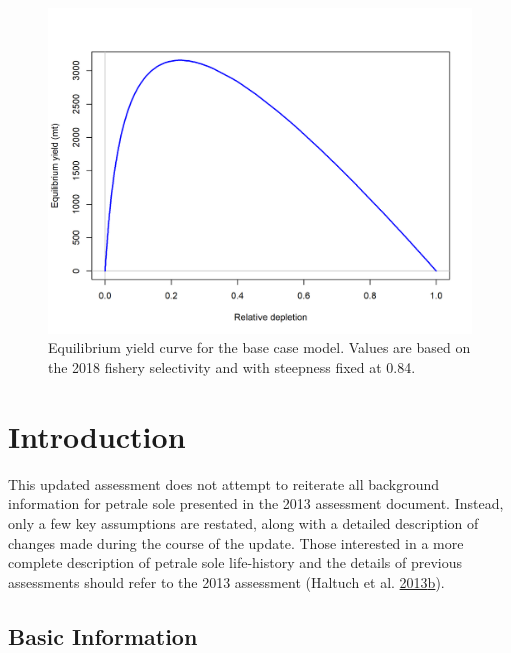 \documentclass[12pt,]{article}
\begin{document}
\begin{figure}
\centering
\includegraphics{r4ss/plots_mod1/yield1_yield_curve.png}
\caption{Equilibrium yield curve for the base case model. Values are
based on the 2018 fishery selectivity and with steepness fixed at 0.84.
\label{fig:Yield_all}}
\end{figure}

\FloatBarrier

\newpage

\renewcommand{\thefigure}{\arabic{figure}}
\renewcommand{\thetable}{\arabic{table}}

\setcounter{figure}{0} \setcounter{table}{0}


\section{Introduction}\label{introduction}

This updated assessment does not attempt to reiterate all background
information for petrale sole presented in the 2013 assessment document.
Instead, only a few key assumptions are restated, along with a detailed
description of changes made during the course of the update. Those
interested in a more complete description of petrale sole life-history
and the details of previous assessments should refer to the 2013
assessment (Haltuch et al.
\protect\hyperlink{ref-haltuch_status_2013}{2013}\protect\hyperlink{ref-haltuch_status_2013}{b}).

\subsection{Basic Information}\label{basic-information}
\end{document}
